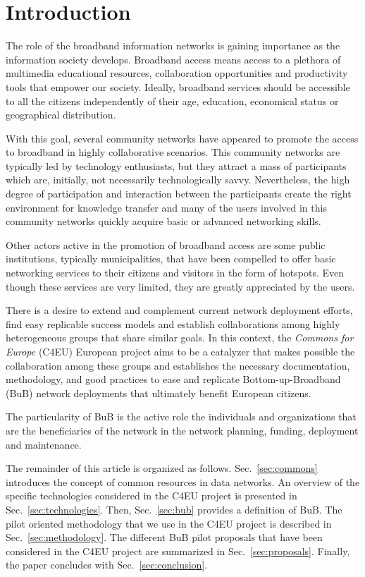 \documentclass[conference]{IEEEtran}
\begin{document}
\section{Introduction}
The role of the broadband information networks is gaining importance as the information society develops.
Broadband access means access to a plethora of multimedia educational resources, collaboration opportunities and productivity tools that empower our society.
Ideally, broadband services should be accessible to all the citizens independently of their age, education, economical status or geographical distribution.

With this goal, several community networks have appeared to promote the access to broadband in highly collaborative scenarios.
This community networks are typically led by technology enthusiasts, but they attract a mass of participants which are, initially, not necessarily technologically savvy. 
Nevertheless, the high degree of participation and interaction between the participants create the right environment for knowledge transfer and many of the users involved in this community networks quickly acquire basic or advanced networking skills.

Other actors active in the promotion of broadband access are some public institutions, typically municipalities, that have been compelled to offer basic networking services to their citizens and visitors in the form of hotspots.
Even though these services are very limited, they are greatly appreciated by the users.

There is a desire to extend and complement current network deployment efforts, find easy replicable success models and establish collaborations among highly heterogeneous groups that share similar goals.
In this context, the \emph{Commons for Europe} (C4EU) European project aims to be a catalyzer that makes possible the collaboration among these groups and establishes the necessary documentation, methodology, and good practices to ease and replicate Bottom-up-Broadband (BuB) network deployments that ultimately benefit European citizens.

The particularity of BuB is the active role the individuals and organizations that are the beneficiaries of the network in the network planning, funding, deployment and maintenance.

The remainder of this article is organized as follows.
Sec.~\ref{sec:commons} introduces the concept of common resources in data networks.
An overview of the specific technologies considered in the C4EU project is presented in Sec.~\ref{sec:technologies}.
Then, Sec.~\ref{sec:bub} provides a definition of BuB.
The pilot oriented methodology that we use in the C4EU project is described in Sec.~\ref{sec:methodology}.
The different BuB pilot proposals that have been considered in the C4EU project are summarized in Sec.~\ref{sec:proposals}.
Finally, the paper concludes with Sec.~\ref{sec:conclusion}.
\end{document}
